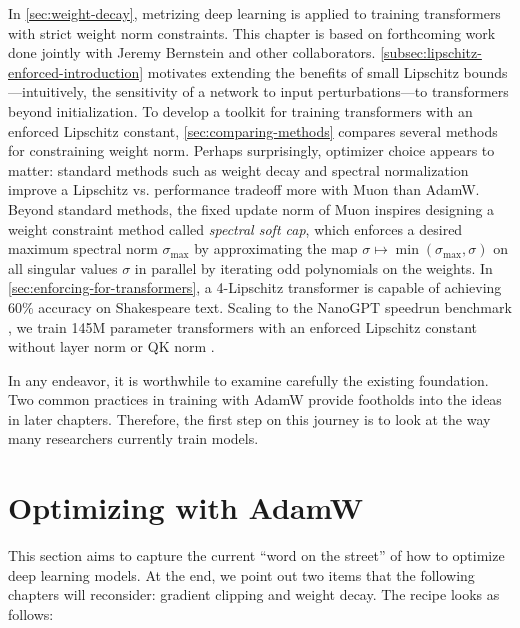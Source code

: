 In \cref{sec:weight-decay}, metrizing deep learning is applied to training transformers with strict weight norm constraints. This chapter is based on forthcoming work done jointly with Jeremy Bernstein and other collaborators. \cref{subsec:lipschitz-enforced-introduction} motivates extending the benefits of small Lipschitz bounds---intuitively, the sensitivity of a network to input perturbations---to transformers beyond initialization. To develop a toolkit for training transformers with an enforced Lipschitz constant, \cref{sec:comparing-methods} compares several methods for constraining weight norm. Perhaps surprisingly, optimizer choice appears to matter: standard methods such as weight decay \citep{krogh1991simple} and spectral normalization \citep{yoshida2017spectralnormregularizationimproving} improve a Lipschitz vs. performance tradeoff more with Muon than AdamW. Beyond standard methods, the fixed update norm of Muon inspires designing a weight constraint method called \textit{spectral soft cap}, which enforces a desired maximum spectral norm $\sigma_\text{max}$ by approximating the map $\sigma \mapsto \min(\sigma_\text{max}, \sigma)$ on all singular values $\sigma$ in parallel by iterating odd polynomials on the weights. In \cref{sec:enforcing-for-transformers}, a 4-Lipschitz transformer is capable of achieving 60\% accuracy on Shakespeare text. Scaling to the NanoGPT speedrun benchmark \citep{modded_nanogpt_2024}, we train 145M parameter transformers with an enforced Lipschitz constant without layer norm \citep{ba2016layernormalization} or QK norm \citep{henry2020querykeynormalizationtransformers}.

In any endeavor, it is worthwhile to examine carefully the existing foundation. Two common practices in training with AdamW provide footholds into the ideas in later chapters. Therefore, the first step on this journey is to look at the way many researchers currently train models.

\section{Optimizing with AdamW}

This section aims to capture the current ``word on the street'' of how to optimize deep learning models. At the end, we point out two items that the following chapters will reconsider: gradient clipping and weight decay. The recipe looks as follows:


